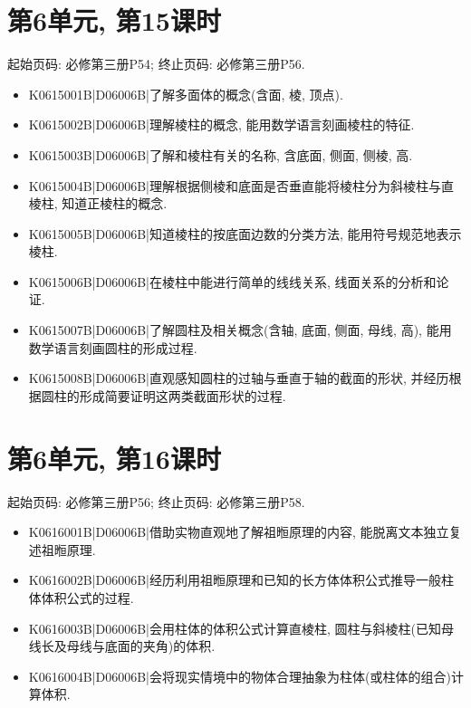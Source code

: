 \section*{第6单元, 第15课时}
起始页码: 必修第三册P54; 终止页码: 必修第三册P56.
\begin{itemize}
\item K0615001B|D06006B|了解多面体的概念(含面, 棱, 顶点).
\item K0615002B|D06006B|理解棱柱的概念, 能用数学语言刻画棱柱的特征.
\item K0615003B|D06006B|了解和棱柱有关的名称, 含底面, 侧面, 侧棱, 高.
\item K0615004B|D06006B|理解根据侧棱和底面是否垂直能将棱柱分为斜棱柱与直棱柱, 知道正棱柱的概念.
\item K0615005B|D06006B|知道棱柱的按底面边数的分类方法, 能用符号规范地表示棱柱.
\item K0615006B|D06006B|在棱柱中能进行简单的线线关系, 线面关系的分析和论证.
\item K0615007B|D06006B|了解圆柱及相关概念(含轴, 底面, 侧面, 母线, 高), 能用数学语言刻画圆柱的形成过程.
\item K0615008B|D06006B|直观感知圆柱的过轴与垂直于轴的截面的形状, 并经历根据圆柱的形成简要证明这两类截面形状的过程.
\end{itemize}

\section*{第6单元, 第16课时}
起始页码: 必修第三册P56; 终止页码: 必修第三册P58.
\begin{itemize}
\item K0616001B|D06006B|借助实物直观地了解祖暅原理的内容, 能脱离文本独立复述祖暅原理.
\item K0616002B|D06006B|经历利用祖暅原理和已知的长方体体积公式推导一般柱体体积公式的过程.
\item K0616003B|D06006B|会用柱体的体积公式计算直棱柱, 圆柱与斜棱柱(已知母线长及母线与底面的夹角)的体积.
\item K0616004B|D06006B|会将现实情境中的物体合理抽象为柱体(或柱体的组合)计算体积.
\end{itemize}


